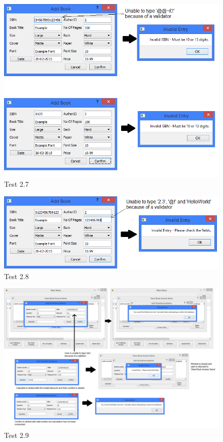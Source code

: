 \begin{landscape}
\begin{figure}[H]
    \includegraphics[width=\textwidth]{./Testing/Evidence/Series2/ISBNRejection.png}
    \caption{Test 2.7}  \label{fig:ISBNRejection}
\end{figure}


\begin{figure}[H]
    \includegraphics[width=\textwidth]{./Testing/Evidence/Series2/PagesRejection.png}
    \caption{Test 2.8}  \label{fig:PagesRejection}
\end{figure}


\begin{figure}[H]
    \includegraphics[width=\textwidth]{./Testing/Evidence/Series2/BookInvoiceDiscountValidation.png}
    \caption{Test 2.9}  \label{fig:BookInvoiceDiscountValidation}
\end{figure}



\end{landscape}
